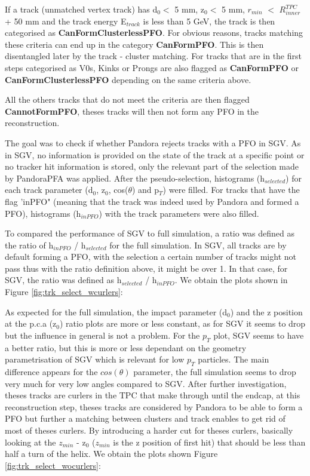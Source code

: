 \documentclass[a4paper,12pt]{article}
\begin{document}
If a track (unmatched vertex track) has d$_0 <$ 5 mm, z$_0 <$ 5 mm, $r_{min}$  $<$ $R^{TPC}_{inner}$ + 50 mm and the track energy E$_{track}$ is less than 5 GeV, the track is then categorised as \textbf{CanFormClusterlessPFO}. For obvious reasons, tracks matching these criteria can end up in the category \textbf{CanFormPFO}. This is then disentangled later by the track - cluster matching. 
For tracks that are in the first steps categorised as V0s, Kinks or Prongs are also flagged as \textbf{CanFormPFO} or \textbf{CanFormClusterlessPFO} depending on the same criteria above.

All the others tracks that do not meet the criteria are then flagged \textbf{CannotFormPFO}, theses tracks will then not form any PFO in the reconstruction.

The goal was to check if whether Pandora rejects tracks with a PFO in SGV. As in SGV, no information is provided on the state of the track at a specific point or no tracker hit information is stored, only the relevant part of the selection made by PandoraPFA was applied. After the pseudo-selection, histograms (h$_{selected}$) for each track parameter (d$_0$, z$_0$, cos($\theta$) and p$_T$) were filled. For tracks that have the flag 'inPFO" (meaning that the track was indeed used by Pandora and formed a PFO), histograms (h$_{inPFO}$) with the track parameters were also filled.

To compared the performance of SGV to full simulation, a ratio was defined as the ratio of h$_{inPFO}$ / h$_{selected}$ for the full simulation. In SGV, all tracks are by default forming a PFO, with the selection a certain number of tracks might not pass thus with the ratio definition above, it might be over 1. In that case, for SGV, the ratio was defined as h$_{selected}$ / h$_{inPFO}$.
We obtain the plots shown in Figure \ref{fig:trk_select_wcurlers}:

As expected for the full simulation, the impact parameter (d$_0$) and the z position at the p.c.a (z$_0$) ratio plots are more or less constant, as for SGV it seems to drop but the influence in general is not a problem. For the $p_{T}$ plot, SGV seems to have a better ratio, but this is more or less dependant on the geometry parametrisation of SGV which is relevant for low $p_{T}$ particles. The main difference appears for the $cos(\theta)$ parameter, the full simulation seems to drop very much for very low angles compared to SGV. After further investigation, theses tracks are curlers in the TPC that make through until the endcap, at this reconstruction step, theses tracks are considered by Pandora to be able to form a PFO but further a matching between clusters and track enables to get rid of most of theses curlers. By introducing a harder cut for theses curlers, basically looking at the $z_{min}$ - z$_0$ ($z_{min}$ is the z position of first hit) that should be less than half a turn of the helix. We obtain the plots shown Figure \ref{fig:trk_select_wocurlers}:
\end{document}
